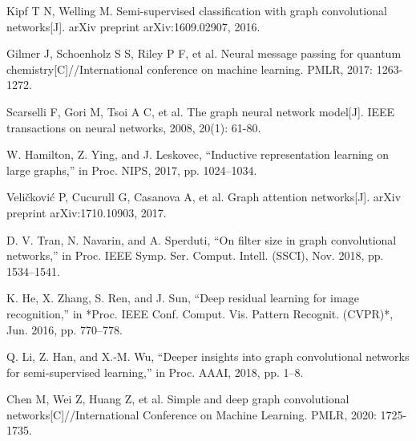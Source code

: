 \documentclass[10pt,journal,compsoc]{IEEEtran}
\begin{document}
\noindent
[20] Kipf T N, Welling M. Semi-supervised classification with graph convolutional networks[J]. arXiv preprint arXiv:1609.02907, 2016.

\noindent
[21] Gilmer J, Schoenholz S S, Riley P F, et al. Neural message passing for quantum chemistry[C]//International conference on machine learning. PMLR, 2017: 1263-1272.

\noindent
[22] Scarselli F, Gori M, Tsoi A C, et al. The graph neural network model[J]. IEEE transactions on neural networks, 2008, 20(1): 61-80.

\noindent
[23] W. Hamilton, Z. Ying, and J. Leskovec, “Inductive representation learning on large graphs,” in Proc. NIPS, 2017, pp. 1024–1034.

\noindent
[24] Veličković P, Cucurull G, Casanova A, et al. Graph attention networks[J]. arXiv preprint arXiv:1710.10903, 2017.

\noindent
[25] D. V. Tran, N. Navarin, and A. Sperduti, “On filter size in graph convolutional networks,” in Proc. IEEE Symp. Ser. Comput. Intell. (SSCI), Nov. 2018, pp. 1534–1541.

\noindent
[26] K. He, X. Zhang, S. Ren, and J. Sun, “Deep residual learning for image recognition,” in *Proc. IEEE Conf. Comput. Vis. Pattern Recognit. (CVPR)*, Jun. 2016, pp. 770–778.

\noindent
[27] Q. Li, Z. Han, and X.-M. Wu, “Deeper insights into graph convolutional networks for semi-supervised learning,” in Proc. AAAI, 2018, pp. 1–8.

\noindent
[28] Chen M, Wei Z, Huang Z, et al. Simple and deep graph convolutional networks[C]//International Conference on Machine Learning. PMLR, 2020: 1725-1735.
\end{document}
